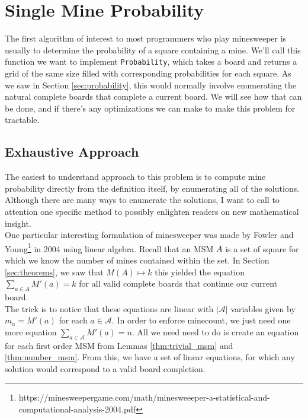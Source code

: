 \section{Single Mine Probability}
The first algorithm of interest to most programmers who play minesweeper is usually to determine the probability of a square containing a mine. We'll call this function we want to implement \texttt{Probability}, which takes a board and returns a grid of the same size filled with corresponding probabilities for each square. As we saw in Section \ref{sec:probability}, this would normally involve enumerating the natural complete boards that complete a current board. We will see how that can be done, and if there's any optimizations we can make to make this problem for tractable.\\

\subsection{Exhaustive Approach}

The easiest to understand approach to this problem is to compute mine probability directly from the definition itself, by enumerating all of the solutions.\\

Although there are many ways to enumerate the solutions, I want to call to attention one specific method to possibly enlighten readers on new mathematical insight.\\

One particular interesting formulation of minesweeper was made by Fowler and Young\footnote{https://minesweepergame.com/math/minesweeeper-a-statistical-and-computational-analysis-2004.pdf} in 2004 using linear algebra. Recall that an MSM $A$ is a set of square for which we know the number of mines contained within the set. In Section \ref{sec:theorems}, we saw that $M(A)\mapsto k$ this yielded the equation $\sum_{a\in A}M'(a)=k$ for all valid complete boards that continue our current board.\\

The trick is to notice that these equations are linear with $|\mathcal{A}|$ variables given by $m_a=M'(a)$ for each $a\in\mathcal{A}$. In order to enforce minecount, we just need one more equation $\sum_{a\in\mathcal{A}}M'(a)=n$. All we need need to do is create an equation for each first order MSM from Lemmas \ref{thm:trivial_msm} and \ref{thm:number_msm}. From this, we have a set of linear equations, for which any solution would correspond to a valid board completion.\\

